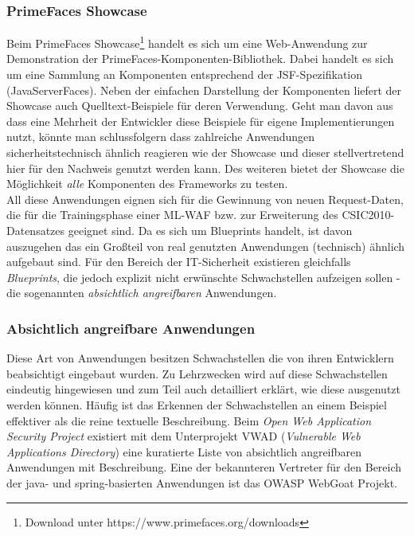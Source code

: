 \subsubsection{PrimeFaces Showcase}

Beim PrimeFaces Showcase\footnote{Download unter https://www.primefaces.org/downloads} handelt es sich um eine Web-Anwendung zur Demonstration der PrimeFaces-Komponenten-Bibliothek. Dabei handelt es sich um eine Sammlung an Komponenten entsprechend der JSF-Spezifikation (JavaServerFaces). Neben der einfachen Darstellung der Komponenten liefert der Showcase auch Quelltext-Beispiele für deren Verwendung. Geht man davon aus dass eine Mehrheit der Entwickler diese Beispiele für eigene Implementierungen nutzt, könnte man schlussfolgern dass zahlreiche Anwendungen sicherheitstechnisch ähnlich reagieren wie der Showcase und dieser stellvertretend hier für den Nachweis genutzt werden kann. Des weiteren bietet der Showcase die Möglichkeit \emph{alle} Komponenten des Frameworks zu testen.\\

All diese Anwendungen eignen sich für die Gewinnung von neuen Request-Daten, die für die Trainingsphase einer ML-WAF bzw. zur Erweiterung des CSIC2010-Datensatzes geeignet sind. Da es sich um Blueprints handelt, ist davon auszugehen das ein Großteil von real genutzten Anwendungen (technisch) ähnlich aufgebaut sind. Für den Bereich der IT-Sicherheit existieren gleichfalls \emph{Blueprints}, die jedoch explizit nicht erwünschte Schwachstellen aufzeigen sollen - die sogenannten \emph{absichtlich angreifbaren} Anwendungen. 

\subsubsection{Absichtlich angreifbare Anwendungen}
\label{sec:absangan}
Diese Art von Anwendungen besitzen Schwachstellen die von ihren Entwicklern beabsichtigt eingebaut wurden. Zu Lehrzwecken wird auf diese Schwachstellen eindeutig hingewiesen und zum Teil auch detailliert erklärt, wie diese ausgenutzt werden können. Häufig ist das Erkennen der Schwachstellen an einem Beispiel effektiver als die reine textuelle Beschreibung. Beim \emph{Open Web Application Security Project} existiert mit dem Unterprojekt VWAD (\emph{Vulnerable Web Applications Directory}) eine kuratierte Liste von absichtlich angreifbaren Anwendungen mit Beschreibung. Eine der bekannteren Vertreter für den Bereich der java- und spring-basierten Anwendungen ist das OWASP WebGoat Projekt.

